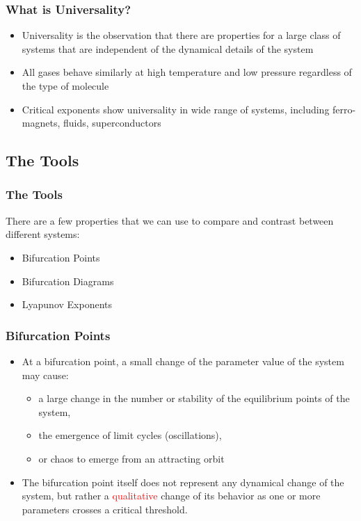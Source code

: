 \documentclass[
	11pt, %
	aspectratio=169, %
]{beamer}
\begin{document}
\begin{frame}
	\frametitle{What is Universality?}
	
	\begin{itemize}
        \item Universality is the observation that there are properties for a large class of systems that are independent of the dynamical details of the system \pause
        \item All gases behave similarly at high temperature and low pressure regardless of the type of molecule \pause
        \item Critical exponents show universality in wide range of systems, including ferro-magnets, fluids, superconductors
    \end{itemize}

\end{frame}


\subsection{The Tools}

\begin{frame}
	\frametitle{The Tools}
	There are a few properties that we can use to compare and contrast between different systems: \pause
    \begin{itemize}
        \item Bifurcation Points \pause
        \item Bifurcation Diagrams \pause
        \item Lyapunov Exponents
    \end{itemize}

\end{frame}


\begin{frame}
	\frametitle{Bifurcation Points}
    \begin{itemize}
        \item At a bifurcation point, a small change of the parameter value of the system may cause:
        \begin{itemize}
            \item a large change in the number or stability of the equilibrium points of the system,
            \item the emergence of limit cycles (oscillations),
            \item or chaos to emerge from an attracting orbit
        \end{itemize} \pause
        \item The bifurcation point itself does not represent any dynamical change of the system, but rather a \textcolor{red}{qualitative} change of its behavior as one or more parameters crosses a critical threshold.
    \end{itemize}
\end{frame}
\end{document}
